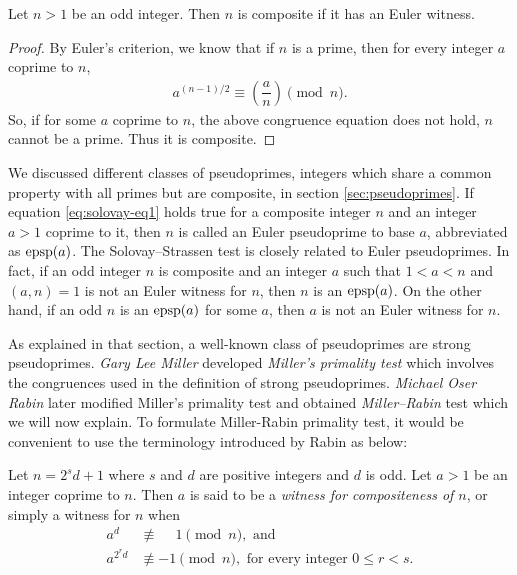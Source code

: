 \documentclass{subfiles}
\begin{document}
		\begin{theorem}
			Let $n>1$ be an odd integer. Then $n$ is composite if it has an Euler witness.
		\end{theorem}
		
		\begin{proof}
			By Euler's criterion, we know that if $n$ is a prime, then for every integer $a$ coprime to $n$,
				\begin{align}
					a^{(n-1)/2}  \equiv \left(\dfrac{a}{n}\right) \pmod n. \label{eq:solovay-eq1}
				\end{align}
			So, if for some $a$ coprime to $n$, the above congruence equation does not hold, $n$ cannot be a prime. Thus it is composite.
		\end{proof}
 
		\begin{remark}
					We discussed different classes of pseudoprimes, integers which share a common property with all primes but are composite, in section \eqref{sec:pseudoprimes}. If equation \eqref{eq:solovay-eq1} holds true for a composite integer $n$ and an integer $a>1$ coprime to it, then $n$ is called an Euler pseudoprime to base $a$, abbreviated as $\operatorname{epsp}(a)$. The Solovay--Strassen test is closely related to Euler pseudoprimes. In fact, if an odd integer $n$ is composite and an integer $a$ such that $1<a<n$ and $(a,n)=1$ is not an Euler witness for $n$, then $n$ is an $\operatorname{epsp}(a)$. On the other hand, if an odd $n$ is an $\operatorname{epsp}(a)$ for some $a$, then $a$ is not an Euler witness for $n$.
		\end{remark}
		
	 As explained in that section, a well-known class of pseudoprimes are strong pseudoprimes. \textit{Gary Lee Miller} developed \textit{Miller's primality test} which involves the congruences used in the definition of strong pseudoprimes. \textit{Michael Oser Rabin} later modified Miller's primality test and obtained \textit{Miller--Rabin} test which we will now explain. To formulate Miller-Rabin primality test, it would be convenient to use the terminology introduced by Rabin as below:
	
		\begin{definition}
			Let $n=2^sd+1$ where $s$ and $d$ are positive integers and $d$ is odd. Let $a>1$ be an integer coprime to $n$. Then $a$ is said to be a \textit{witness for compositeness of $n$}, or simply a witness for $n$ when
				\begin{align*}
				a^d &\not\equiv \phantom{-} 1 \pmod n, \text{ and}\\
				a^{2^rd} &\not\equiv -1 \pmod n, \text{ for every integer } 0 \leq r <s.
				\end{align*}
		\end{definition}
		
\end{document}
